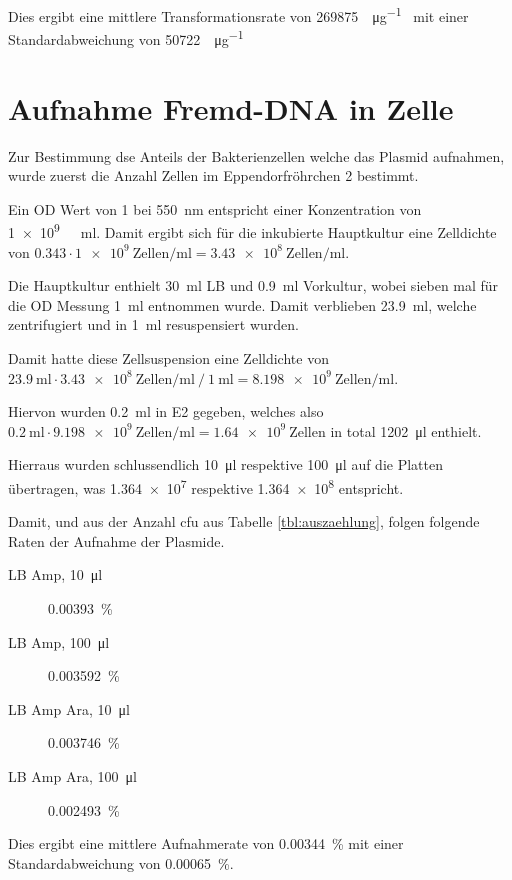 \documentclass[a4paper,english]{scrreprt}
\begin{document}
Dies ergibt eine mittlere Transformationsrate von \SI{269875}{\cfu \per \ug
{}} mit einer Standardabweichung von \SI{50722}{\cfu \per \ug
{}}

\section{Aufnahme Fremd-DNA in Zelle}

Zur Bestimmung dse Anteils der Bakterienzellen welche das Plasmid aufnahmen,
wurde zuerst die Anzahl Zellen im Eppendorfröhrchen 2 bestimmt.

Ein OD Wert von 1 bei \SI{550}{\nm} entspricht einer Konzentration von
\SI{1e9}{ \per \ml}. Damit ergibt sich für die inkubierte
Hauptkultur eine Zelldichte von $0.343 \cdot \SI{1e9}{\text{Zellen} \per \ml}=
\SI{3.43e8}{\text{Zellen} \per \ml}$.

Die Hauptkultur enthielt \SI{30}{\ml} LB und \SI{0.9}{\ml} Vorkultur, wobei
sieben mal für die OD Messung \SI{1}{\ml} entnommen wurde. Damit verblieben
\SI{23.9}{\ml}, welche zentrifugiert und in \SI{1}{\ml} 
resuspensiert wurden.

Damit hatte diese Zellsuspension eine Zelldichte von $\SI{23.9}{\ml} \cdot
\SI{3.43e8}{\text{Zellen} \per \ml}\ /\ \SI{1}{\ml} =
\SI{8.198e9}{\text{Zellen}\per \ml}$.

Hiervon wurden \SI{0.2}{\ml} in E2 gegeben, welches also $\SI{0.2}{\ml} \cdot
\SI{9.198e9}{\text{Zellen}\per \ml} = \SI{1.64e9}{\text{Zellen}}$ in total
\SI{1202}{\ul} enthielt.

Hierraus wurden schlussendlich \SI{10}{\ul} respektive \SI{100}{\ul} auf die
Platten übertragen, was \SI{1.364e7}{} respektive
\SI{1.364e8}{} entspricht.

Damit, und aus der Anzahl cfu aus Tabelle \ref{tbl:auszaehlung}, folgen
folgende Raten der Aufnahme der Plasmide.

\begin{description}
	\item[LB Amp, \SI{10}{\ul}] \SI{0.00393}{\percent}
	\item[LB Amp, \SI{100}{\ul}] \SI{0.003592}{\percent}
	\item[LB Amp Ara, \SI{10}{\ul}] \SI{0.003746}{\percent}
	\item[LB Amp Ara, \SI{100}{\ul}] \SI{0.002493}{\percent}
\end{description}

Dies ergibt eine mittlere Aufnahmerate von \SI{0.00344}{\percent} mit einer
Standardabweichung von \SI{0.00065}{\percent}.



\end{document}
